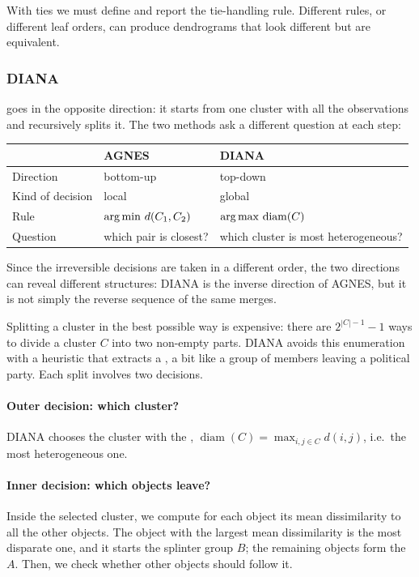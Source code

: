 \begin{remark}
With ties we must define and report the tie-handling rule. Different rules, or different leaf orders, can produce dendrograms that look different but are equivalent.
\end{remark}

\subsubsection{DIANA}

 goes in the opposite direction: it starts from one cluster with all the observations and recursively splits it. The two methods ask a different question at each step:
\begin{center}
\begin{tabular}{@{}lll@{}}
\toprule
 & AGNES & DIANA \\
\midrule
Direction & bottom-up & top-down \\
Kind of decision & local & global \\
Rule & $\operatorname*{arg\,min}\, d(C_1, C_2)$ & $\operatorname*{arg\,max}\, \operatorname{diam}(C)$ \\
Question & which pair is closest? & which cluster is most heterogeneous? \\
\bottomrule
\end{tabular}
\end{center}
Since the irreversible decisions are taken in a different order, the two directions can reveal different structures: DIANA is the inverse direction of AGNES, but it is not simply the reverse sequence of the same merges.

Splitting a cluster in the best possible way is expensive: there are $2^{|C|-1} - 1$ ways to divide a cluster $C$ into two non-empty parts. DIANA avoids this enumeration with a heuristic that extracts a , a bit like a group of members leaving a political party. Each split involves two decisions.

\paragraph{Outer decision: which cluster?} DIANA chooses the cluster with the , $\operatorname{diam}(C) = \max_{i,j \in C} d(i,j)$, i.e.\ the most heterogeneous one.

\paragraph{Inner decision: which objects leave?} Inside the selected cluster, we compute for each object its mean dissimilarity to all the other objects. The object with the largest mean dissimilarity is the most disparate one, and it starts the splinter group $B$; the remaining objects form the  $A$. Then, we check whether other objects should follow it.

